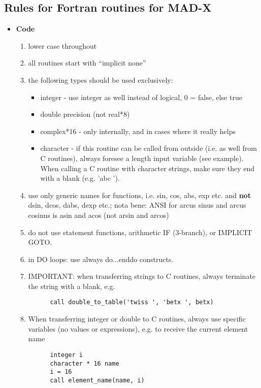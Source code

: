 


\subsection{ Rules for Fortran routines for MAD-X}

\begin{itemize}
 
   \item \textbf{ Code}
     \begin{enumerate}
        \item lower case throughout
	\item all routines start with ``implicit none''
	\item the following types should be used exclusively:    
          \begin{itemize}
	     \item integer - use integer as well instead of logical, 0 = false, else true
	     \item double precision (not real*8)
	     \item complex*16 - only internally, and in cases where it really helps
	     \item character - if this routine can be called from
               outside (i.e. as well from C routines), always foresee a
               length input variable (see example). When calling a C
               routine with character strings, make sure they end with a
               blank (e.g. 'abc ').    
          \end{itemize}
	\item use only generic names for functions, i.e. sin, cos, abs,
          exp etc. and \textbf{ not} dsin, dcos, dabs, dexp etc.;
          nota bene: ANSI for arcus sinus and arcus cosinus is asin
          and acos (not arsin and arcos)   
	\item do not use statement functions, arithmetic IF (3-branch), or IMPLICIT GOTO.  
	\item in DO loops: use always do...enddo constructs.  
	\item IMPORTANT: when transferring  strings to C routines, always terminate the string with a blank, e.g. 
\begin{verbatim}
      call double_to_table('twiss ', 'betx ', betx)
\end{verbatim}
        \item When transferring  integer or double to C routines, always
          use     specific variables (no values or expressions), e.g. to
          receive the     current element name  
\begin{verbatim}
      integer i
      character * 16 name
      i = 16
      call element_name(name, i)
\end{verbatim}
     \end{enumerate}


\end{itemize}
